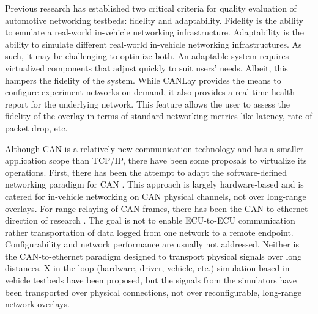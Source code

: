 \documentclass[letterpaper,twocolumn,12pt]{article}
\begin{document}
Previous research \cite{tagarev_automotive_2021} has established two critical criteria for quality evaluation of automotive networking testbeds: fidelity and adaptability. Fidelity is the ability to emulate a real-world in-vehicle networking infrastructure. Adaptability is the ability to simulate different real-world in-vehicle networking infrastructures. 
As such, it may be challenging to optimize both. An adaptable system requires virtualized components that adjust quickly to suit users' needs. 
Albeit, this hampers the fidelity of the system. While CANLay provides the means to configure experiment networks on-demand, it also provides a real-time health report for the underlying network. 
This feature allows the user to assess the fidelity of the overlay in terms of standard networking metrics like latency, rate of packet drop, etc.

Although CAN is a relatively new communication technology and has a smaller application scope than TCP/IP, there have been some proposals to virtualize its operations. 
First, there has been the attempt to adapt the software-defined networking paradigm for CAN \cite{rotermund_requirements_2020,doering_retrofitting_nodate,grewe_bloomycan_2021}. This approach is largely hardware-based and is catered for in-vehicle networking on CAN physical channels, not over long-range overlays. For range relaying of CAN frames, there has been the CAN-to-ethernet direction of research \cite{johanson_relaying_2009,florian_polzlbauer_experience_2019}. 
The goal is not to enable ECU-to-ECU communication rather transportation of data logged from one network to a remote endpoint. 
Configurability and network performance are usually not addressed. Neither is the CAN-to-ethernet paradigm designed to transport physical signals over long distances. 
X-in-the-loop (hardware, driver, vehicle, etc.) simulation-based in-vehicle testbeds \cite{appel_safety_2020} have been proposed, but the signals from the simulators have been transported over physical connections, not over reconfigurable, long-range network overlays. 
\end{document}
